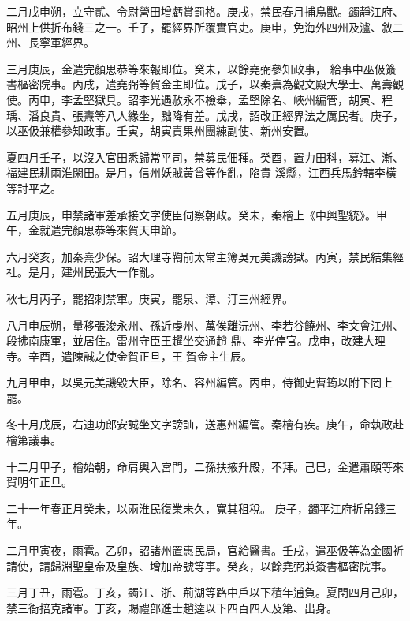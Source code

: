 \begin{pinyinscope}
 二月戊申朔，立守貳、令尉營田增虧賞罰格。庚戌，禁民春月捕鳥獸。蠲靜江府、昭州上供折布錢三之一。壬子，罷經界所覆實官吏。庚申，免海外四州及瀘、敘二州、長寧軍經界。



 三月庚辰，金遣完顏思恭等來報即位。癸未，以餘堯弼參知政事，
 給事中巫伋簽書樞密院事。丙戌，遣堯弼等賀金主即位。戊子，以秦熹為觀文殿大學士、萬壽觀使。丙申，李孟堅獄具。詔李光遇赦永不檢舉，孟堅除名、峽州編管，胡寅、程瑀、潘良貴、張燾等八人緣坐，黜降有差。戊戌，詔改正經界法之厲民者。庚子，以巫伋兼權參知政事。壬寅，胡寅責果州團練副使、新州安置。



 夏四月壬子，以沒入官田悉歸常平司，禁募民佃種。癸酉，置力田科，募江、漸、福建民耕兩淮閑田。是月，信州妖賊黃曾等作亂，陷貴
 溪縣，江西兵馬鈐轄李橫等討平之。



 五月庚辰，申禁諸軍差承接文字使臣伺察朝政。癸未，秦檜上《中興聖統》。甲午，金就遣完顏思恭等來賀天申節。



 六月癸亥，加秦熹少保。詔大理寺鞫前太常主簿吳元美譏謗獄。丙寅，禁民結集經社。是月，建州民張大一作亂。



 秋七月丙子，罷招刺禁軍。庚寅，罷泉、漳、汀三州經界。



 八月申辰朔，量移張浚永州、孫近虔州、萬俟離沅州、李若谷饒州、李文會江州、段拂南康軍，並居住。雷州守臣王趯坐交通趙
 鼎、李光停官。戊申，改建大理寺。辛酉，遣陳誠之使金賀正旦，王𥍓賀金主生辰。



 九月甲申，以吳元美譏毀大臣，除名、容州編管。丙申，侍御史曹筠以附下罔上罷。



 冬十月戊辰，右迪功郎安誠坐文字謗訕，送惠州編管。秦檜有疾。庚午，命執政赴檜第議事。



 十二月甲子，檜始朝，命肩輿入宮門，二孫扶掖升殿，不拜。己巳，金遣蕭頤等來賀明年正旦。



 二十一年春正月癸未，以兩淮民復業未久，寬其租稅。
 庚子，蠲平江府折帛錢三年。



 二月甲寅夜，雨雹。乙卯，詔諸州置惠民局，官給醫書。壬戌，遣巫伋等為金國祈請使，請歸淵聖皇帝及皇族、增加帝號等事。癸亥，以餘堯弼兼簽書樞密院事。



 三月丁丑，雨雹。丁亥，蠲江、浙、荊湖等路中戶以下積年逋負。夏閏四月己卯，禁三衙掊克諸軍。丁亥，賜禮部進士趙逵以下四百四人及第、出身。




\end{pinyinscope}
